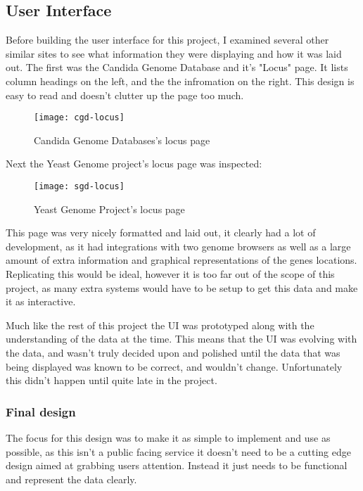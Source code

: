 {\subsection{User Interface}
Before building the user interface for this project, I examined several other similar sites to see what information they were displaying and how it was laid out. The first was the Candida Genome Database\cite{cgd} and it's "Locus" page. It lists column headings on the left, and the the infromation on the right. This design is easy to read and doesn't clutter up the page too much.

\begin{figure}[H]
\begin{center}
\texttt{[image: cgd-locus]}
\caption{Candida Genome Databases's locus page}
\end{center}
\end{figure}

Next the Yeast Genome\cite{sgd} project's locus page was inspected:

\begin{figure}[H]
\begin{center}
\texttt{[image: sgd-locus]}
\caption{Yeast Genome Project's locus page}
\end{center}
\end{figure}

This page was very nicely formatted and laid out, it clearly had a lot of development, as it had integrations with two genome browsers as well as a large amount of extra information and graphical representations of the genes locations. Replicating this would be ideal, however it is too far out of the scope of this project, as many extra systems would have to be setup to get this data and make it as interactive.

Much like the rest of this project the UI was prototyped along with the understanding of the data at the time. This means that the UI was evolving with the data, and wasn't truly decided upon and polished until the data that was being displayed was known to be correct, and wouldn't change. Unfortunately this didn't happen until quite late in the project. 

\subsubsection{Final design}
The focus for this design was to make it as simple to implement and use as possible, as this isn't a public facing service it doesn't need to be a cutting edge design aimed at grabbing users attention. Instead it just needs to be functional and represent the data clearly. 

}
